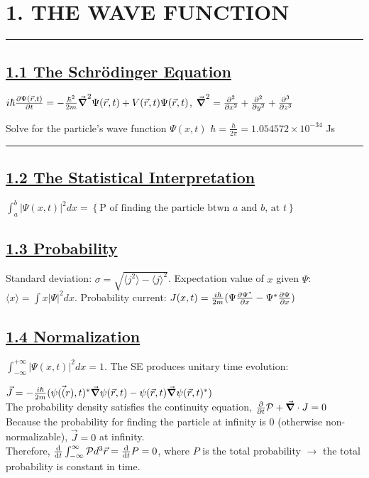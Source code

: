 \section{1. THE WAVE FUNCTION} \hrule height 0.3pt \thinspace

\subsection{\underline{1.1 The Schr\"{o}dinger Equation}}

$i \hbar \pdv{\Psi(\vec{r}, t)}{t} = -\frac{\hbar^2}{2m} \vec{\grad}^2 \Psi(\vec{r}, t) + V(\vec{r}, t) \Psi(\vec{r}, t)$,
$\vec{\grad}^2 = \pdv[2]{}{x} + \pdv[2]{}{y} + \pdv[3]{}{z}$

Solve for the particle's wave function $\Psi(x, t)$
$\hbar = \frac{h}{2\pi} = 1.054572 \times 10^{-34}$ Js

\smallskip \hrule height 0.3pt

\subsection{\underline{1.2 The Statistical Interpretation}}

$\int_{a}^{b} |\Psi(x, t)|^2 dx = \left\{ \textrm{P of finding the particle btwn $a$ and $b$, at $t$} \right\}$ \\

\subsection{\underline{1.3 Probability}}
Standard deviation: $\sigma = \sqrt{\langle j^2 \rangle - \langle j \rangle ^2}$.
Expectation value of $x$ given $\Psi$: $\langle x \rangle = \int x |\Psi|^2 dx$.
Probability current: $J(x, t)=\frac{i \hbar}{2m} (\Psi \pdv{\Psi^*}{x} - \Psi^* \pdv{\Psi}{x})$

\subsection{\underline{1.4 Normalization}}

$\int_{-\infty}^{+\infty} |\Psi (x, t)|^2 dx = 1$.
The SE produces unitary time evolution:

$\vec{J} = - \frac{i \hbar}{2m} (\psi(\vec(r), t)^* \vec{\grad} \psi(\vec{r}, t) - \psi(\vec{r}, t) \vec{\grad} \psi(\vec{r}, t)^*)$ \\
The probability density satisfies the continuity equation, $\pdv{}{t} \mathcal{P} + \vec{\grad} \cdot J = 0$ \\
Because the probability for finding the particle at infinity is 0 (otherwise non-normalizable), $\vec{J} = 0$ at infinity. \\
Therefore, $\dv{}{t} \int_{-\infty}^{\infty} \mathcal{P} d^3 \vec{r} = \dv{}{t} P = 0$, where $P$ is the total probability $\rightarrow$
the total probability is constant in time.

